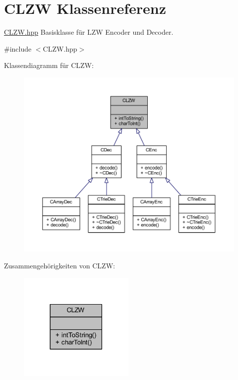 \hypertarget{class_c_l_z_w}{}\section{C\+L\+ZW Klassenreferenz}
\label{class_c_l_z_w}


\hyperlink{_c_l_z_w_8hpp}{C\+L\+Z\+W.\+hpp} Basisklasse für L\+ZW Encoder und Decoder.  




{\ttfamily \#include $<$C\+L\+Z\+W.\+hpp$>$}



Klassendiagramm für C\+L\+ZW\+:
\nopagebreak
\begin{figure}[H]
\begin{center}
\leavevmode
\includegraphics[width=350pt]{class_c_l_z_w__inherit__graph}
\end{center}
\end{figure}


Zusammengehörigkeiten von C\+L\+ZW\+:
\nopagebreak
\begin{figure}[H]
\begin{center}
\leavevmode
\includegraphics[width=158pt]{class_c_l_z_w__coll__graph}
\end{center}
\end{figure}
